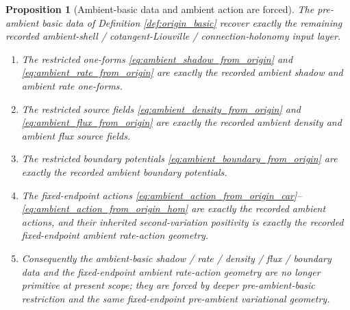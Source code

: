 \documentclass[11pt]{article}
\newtheorem{proposition}{Proposition}
\begin{document}
\begin{proposition}[Ambient-basic data and ambient action are forced]
\label{prop:ambient_basic_forced}
The pre-ambient basic data of Definition \ref{def:origin_basic} recover exactly the remaining recorded ambient-shell / cotangent-Liouville / connection-holonomy input layer.
\begin{enumerate}
    \item The restricted one-forms \eqref{eq:ambient_shadow_from_origin} and \eqref{eq:ambient_rate_from_origin} are exactly the recorded ambient shadow and ambient rate one-forms.
    \item The restricted source fields \eqref{eq:ambient_density_from_origin} and \eqref{eq:ambient_flux_from_origin} are exactly the recorded ambient density and ambient flux source fields.
    \item The restricted boundary potentials \eqref{eq:ambient_boundary_from_origin} are exactly the recorded ambient boundary potentials.
    \item The fixed-endpoint actions \eqref{eq:ambient_action_from_origin_car}--\eqref{eq:ambient_action_from_origin_hom} are exactly the recorded ambient actions, and their inherited second-variation positivity is exactly the recorded fixed-endpoint ambient rate-action geometry.
    \item Consequently the ambient-basic shadow / rate / density / flux / boundary data and the fixed-endpoint ambient rate-action geometry are no longer primitive at present scope; they are forced by deeper pre-ambient-basic restriction and the same fixed-endpoint pre-ambient variational geometry.
\end{enumerate}
\end{proposition}
\end{document}
